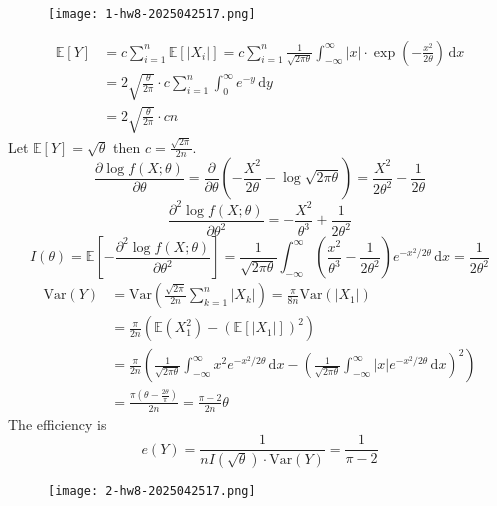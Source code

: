 \begin{exercise}
\begin{figure}[H]
\centering
\texttt{[image: 1-hw8-2025042517.png]}
\label{}
\end{figure}
\end{exercise}
\[
\begin{aligned}
\mathbb{E}[Y] & =c\sum_{i=1}^{n} \mathbb{E}[\lvert X_i \rvert ]=c\sum_{i=1}^{n}\frac{1}{\sqrt{ 2\pi\theta }}\int_{-\infty}^{\infty} \lvert x \rvert \cdot \exp\left(- \frac{x^2}{2\theta} \right) \, \mathrm{d}x \\
 & =2\sqrt{ \frac{\theta}{2\pi} }\cdot c\sum_{i=1}^{n} \int_{0}^{\infty} e^{- y } \, \mathrm{d}y  \\
 & =2\sqrt{ \frac{\theta}{2\pi} }\cdot cn
\end{aligned}
\]
Let $\mathbb{E}[Y]=\sqrt{ \theta }$ then $c=\frac{\sqrt{ 2\pi }}{2n}$.
\[
\frac{ \partial \log f(X;\theta) }{ \partial \theta } =\frac{ \partial   }{ \partial \theta }\left( -\frac{X^2}{2\theta}-\log \sqrt{ 2\pi \theta } \right) =\frac{X^2}{2\theta^{2}}-\frac{1}{2\theta}
\]
\[
\frac{ \partial^2 \log f(X;\theta) }{ \partial \theta ^2 } =-\frac{X^2}{\theta^{3}}+\frac{1}{2\theta^{2}}
\]
\[
I(\theta)=\mathbb{E}\left[ -\frac{ \partial^2 \log f(X;\theta) }{ \partial \theta ^2 }  \right]=\frac{1}{\sqrt{ 2\pi\theta }}\int_{-\infty}^{\infty} \left( \frac{x^2}{\theta^{3}}-\frac{1}{2\theta^{2}} \right)e^{ -x^2/2\theta } \, \mathrm{d}x =\frac{1}{2\theta^{2}}
\]
\[
\begin{aligned}
\mathrm{Var}(Y) & =\mathrm{Var}\left( \frac{\sqrt{ 2\pi }}{2n}\sum_{k=1}^{n} \lvert X_k \rvert  \right)=\frac{\pi}{8n}\mathrm{Var}(\lvert X_1 \rvert ) \\
 & =\frac{\pi}{2n}(\mathbb{E}(X_1^2)-(\mathbb{E}[\lvert X_1 \rvert ])^2) \\
 & =\frac{\pi}{2n}\left( \frac{1}{\sqrt{ 2\pi \theta }}\int_{-\infty}^{\infty} x^2e^{ -x^2/2\theta } \, \mathrm{d}x  -\left( \frac{1}{\sqrt{ 2\pi \theta }}\int_{-\infty}^{\infty} \lvert x \rvert e^{ -x^2/2\theta } \, \mathrm{d}x  \right)^2\right) \\
 & =\frac{\pi  \left(\theta -\frac{2 \theta }{\pi }\right)}{2 n}=\frac{\pi-2}{2n}\theta
\end{aligned}
\]
The efficiency is
\[
e(Y)=\frac{1}{nI(\sqrt{ \theta })\cdot \mathrm{Var}(Y)}=\frac{1}{\pi-2}
\]
\begin{exercise}
\begin{figure}[H]
\centering
\texttt{[image: 2-hw8-2025042517.png]}
\label{}
\end{figure}
\end{exercise}
